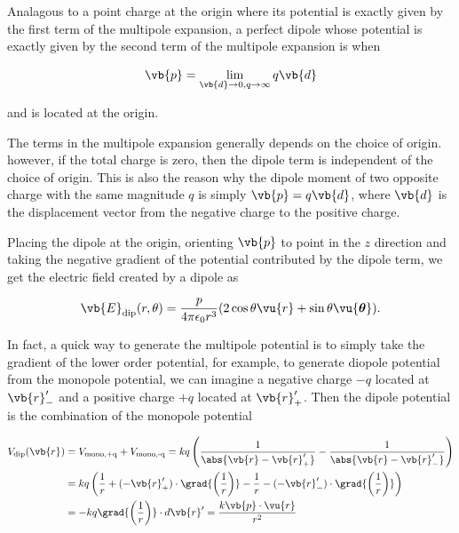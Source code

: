 \documentclass[english,a4paper,12pt]{report}
\begin{document}
Analagous to a point charge at the origin where its potential is exactly given by the first term of the multipole expansion, a perfect dipole whose potential is exactly given by the second term of the multipole expansion is when 

\begin{equation}
    \vb{p} = \lim_{\vb{d}  \to 0, q \to \infty} q\vb{d}  
\end{equation}

and is located at the origin. 

The terms in the multipole expansion generally depends on the choice of origin. however, if the total charge is zero, then the dipole term is independent of the choice of origin. This is also the reason why the dipole moment of two opposite charge with the same magnitude \(q\) is simply \(\vb{p} = q\vb{d} \), where \(\vb{d} \) is the displacement vector from the negative charge to the positive charge. 

Placing the dipole at the origin, orienting \(\vb{p} \) to point in the \(z\) direction and taking the negative gradient of the potential contributed by the dipole term, we get the electric field created by a dipole as

\begin{equation}
    \vb{E} _{\text{dip} } (r, \theta ) = \frac{p}{4\pi \epsilon _0 r^3 }(2\cos \theta \vu{r} + \sin \theta \vu{\boldsymbol{\theta } }). 
\end{equation}

In fact, a quick way to generate the multipole potential is to simply take the gradient of the lower order potential, for example, to generate diopole potential from the monopole potential, we can imagine a negative charge \(-q\) located at \(\vb{r} '_{-}  \) and a positive charge \(+q\) located at \(\vb{r}' _{+}  \). Then the dipole potential is the combination of the monopole potential

\begin{equation}
    \begin{aligned} 
    V_{\text{dip} } (\vb{r} ) &= V_{\text{mono,+q} } + V_{\text{mono,-q} } = kq \left( \frac{1}{\abs{\vb{r} - \vb{r} '_{+} }  } - \frac{1}{\abs{\vb{r} - \vb{r} '_{-} } }   \right) \\
    &= kq \left( \frac{1}{r} + (-\vb{r} '_{+}) \cdot \grad{\left( \frac{1}{r }  \right)} - \frac{1}{r} - (-\vb{r} '_{-} ) \cdot \grad{\left( \frac{1}{r}  \right)}    \right) \\
    &= -kq \grad{\left( \frac{1}{r}  \right)} \cdot d\vb{r} ' = \frac{k \vb{p} \cdot \vu{r} }{r^2} 
    \end{aligned} 
\end{equation}
\end{document}
